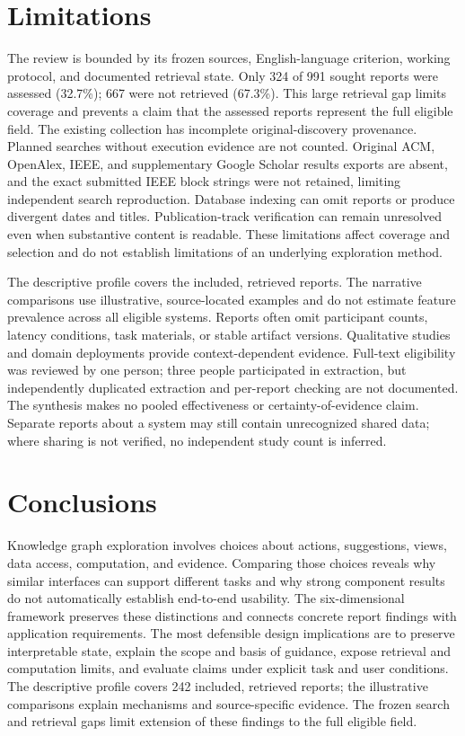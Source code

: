 \documentclass[manuscript,review,screen]{acmart}
\begin{document}
\section{Limitations}
The review is bounded by its frozen sources, English-language criterion, working protocol, and documented retrieval state. Only 324 of 991 sought reports were assessed (32.7\%); 667 were not retrieved (67.3\%). This large retrieval gap limits coverage and prevents a claim that the assessed reports represent the full eligible field. The existing collection has incomplete original-discovery provenance. Planned searches without execution evidence are not counted. Original ACM, OpenAlex, IEEE, and supplementary Google Scholar results exports are absent, and the exact submitted IEEE block strings were not retained, limiting independent search reproduction. Database indexing can omit reports or produce divergent dates and titles. Publication-track verification can remain unresolved even when substantive content is readable. These limitations affect coverage and selection and do not establish limitations of an underlying exploration method.

The descriptive profile covers the included, retrieved reports. The narrative comparisons use illustrative, source-located examples and do not estimate feature prevalence across all eligible systems. Reports often omit participant counts, latency conditions, task materials, or stable artifact versions. Qualitative studies and domain deployments provide context-dependent evidence. Full-text eligibility was reviewed by one person; three people participated in extraction, but independently duplicated extraction and per-report checking are not documented. The synthesis makes no pooled effectiveness or certainty-of-evidence claim. Separate reports about a system may still contain unrecognized shared data; where sharing is not verified, no independent study count is inferred.

\section{Conclusions}
Knowledge graph exploration involves choices about actions, suggestions, views, data access, computation, and evidence. Comparing those choices reveals why similar interfaces can support different tasks and why strong component results do not automatically establish end-to-end usability. The six-dimensional framework preserves these distinctions and connects concrete report findings with application requirements. The most defensible design implications are to preserve interpretable state, explain the scope and basis of guidance, expose retrieval and computation limits, and evaluate claims under explicit task and user conditions. The descriptive profile covers 242 included, retrieved reports; the illustrative comparisons explain mechanisms and source-specific evidence. The frozen search and retrieval gaps limit extension of these findings to the full eligible field.
\end{document}
